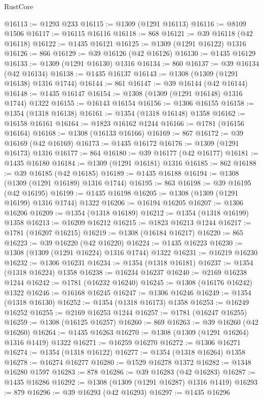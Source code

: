 \begin{lexlean}{RustCore}
\begin{coremodule}
@16113 := @1293 @233
@16115 := @1309 (@1291 @16113)
@16116 := @8109 @1506
@16117 := @16115 @16116
@16118 := 868
@16121 := @39 @16118 (@42 @16118)
@16122 := @1435 @16121
@16125 := @1309 (@1291 @16122) @1316
@16126 := 866
@16129 := @39 @16126 (@42 @16126)
@16130 := @1435 @16129
@16133 := @1309 (@1291 @16130) @1316
@16134 := 860
@16137 := @39 @16134 (@42 @16134)
@16138 := @1435 @16137
@16143 := @1308 (@1309 (@1291 @16138) @1316 @1744)
@16144 := 861
@16147 := @39 @16144 (@42 @16144)
@16148 := @1435 @16147
@16154 := @1308 (@1309 (@1291 @16148) @1316 @1744) @1322
@16155 := @16143 @16154
@16156 := @1306 @16155
@16158 := @1354 (@1318 @16138)
@16161 := @1354 (@1318 @16148) @1358
@16162 := @16158 @16161
@16164 := @1823 @16162 @1244
@16166 := @1781 (@16156 @16164)
@16168 := @1308 (@16133 @16166)
@16169 := 867
@16172 := @39 @16169 (@42 @16169)
@16173 := @1435 @16172
@16176 := @1309 (@1291 @16173) @1316
@16177 := 864
@16180 := @39 @16177 (@42 @16177)
@16181 := @1435 @16180
@16184 := @1309 (@1291 @16181) @1316
@16185 := 862
@16188 := @39 @16185 (@42 @16185)
@16189 := @1435 @16188
@16194 := @1308 (@1309 (@1291 @16189) @1316 @1744)
@16195 := 863
@16198 := @39 @16195 (@42 @16195)
@16199 := @1435 @16198
@16205 := @1308 (@1309 (@1291 @16199) @1316 @1744) @1322
@16206 := @16194 @16205
@16207 := @1306 @16206
@16209 := @1354 (@1318 @16189)
@16212 := @1354 (@1318 @16199) @1358
@16213 := @16209 @16212
@16215 := @1823 @16213 @1244
@16217 := @1781 (@16207 @16215)
@16219 := @1308 (@16184 @16217)
@16220 := 865
@16223 := @39 @16220 (@42 @16220)
@16224 := @1435 @16223
@16230 := @1308 (@1309 (@1291 @16224) @1316 @1744) @1322
@16231 := @16219 @16230
@16232 := @1306 @16231
@16234 := @1354 (@1318 @16181)
@16237 := @1354 (@1318 @16224) @1358
@16238 := @16234 @16237
@16240 := @2169 @16238 @1244
@16242 := @1781 (@16232 @16240)
@16245 := @1308 (@16176 @16242) @1322
@16246 := @16168 @16245
@16247 := @1306 @16246
@16249 := @1354 (@1318 @16130)
@16252 := @1354 (@1318 @16173) @1358
@16253 := @16249 @16252
@16255 := @2169 @16253 @1244
@16257 := @1781 (@16247 @16255)
@16259 := @1308 (@16125 @16257)
@16260 := 869
@16263 := @39 @16260 (@42 @16260)
@16264 := @1435 @16263
@16270 := @1308 (@1309 (@1291 @16264) @1316 @1419) @1322
@16271 := @16259 @16270
@16272 := @1306 @16271
@16274 := @1354 (@1318 @16122)
@16277 := @1354 (@1318 @16264) @1358
@16278 := @16274 @16277
@16280 := @1529 @16278 @1372
@16282 := @1348 @16280 @1597
@16283 := 878
@16286 := @39 @16283 (@42 @16283)
@16287 := @1435 @16286
@16292 := @1308 (@1309 (@1291 @16287) @1316 @1419)
@16293 := 879
@16296 := @39 @16293 (@42 @16293)
@16297 := @1435 @16296

\end{coremodule}
\end{lexlean}
